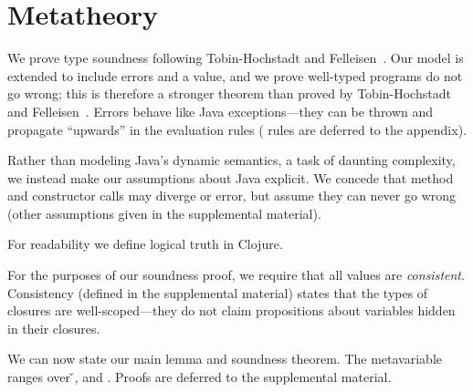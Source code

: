 \chapter{Metatheory}
\label{sec:metatheory}

We prove type soundness following Tobin-Hochstadt and Felleisen~\cite{TF10}.  Our model is extended
to include errors \errorvalv{} and a \wrong{} value, and we prove well-typed
programs do not go wrong; this is therefore a stronger theorem than
proved by Tobin-Hochstadt and Felleisen~\cite{TF10}. 
Errors behave like Java exceptions---they can be thrown and propagate ``upwards'' in the evaluation rules
(\errorvalv{} rules are deferred to the appendix).

Rather than modeling Java's dynamic semantics, a task of daunting
complexity, we instead make our assumptions about Java explicit. We
concede that method and constructor calls may diverge or error, but
assume they can never go wrong
(other assumptions given in the supplemental material).

{}

For readability we define logical truth in Clojure.

{}

For the purposes of our soundness proof, we require that all values
are \emph{consistent}.  Consistency (defined in the supplemental
material) states that the types of closures are well-scoped---they do
not claim propositions about variables hidden in their closures.

{}

We can now state our main lemma and soundness theorem.  The
metavariable  ranges over \v{}, \errorvalv{} and
\wrong{}. Proofs are deferred to the supplemental material. %

\begin{lemma}\label{main:lemma:soundness}

  {\soundnesslemmahypothesis}
\end{lemma}


{}

{}

{}
